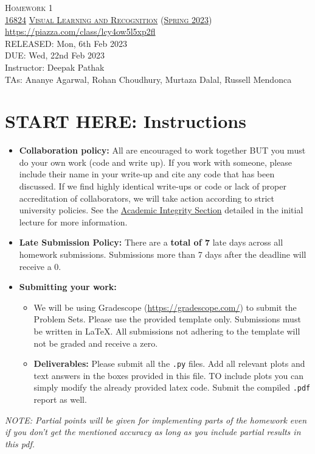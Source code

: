 \documentclass[11pt,addpoints,answers]{exam}
\title{\textsc{\hwName}} %
\author{}
\date{}
\date{}
\numberwithin{equation}{section} %
\numberwithin{figure}{section} %
\numberwithin{table}{section} %
\newcommand{\courseNum}{\href{https://visual-learning.cs.cmu.edu/}{16824}}
\newcommand{\courseName}{\href{https://visual-learning.cs.cmu.edu/}{Visual Learning and Recognition}}
\newcommand{\courseSem}{\href{https://visual-learning.cs.cmu.edu/}{Spring 2023}}
\newcommand{\courseUrl}{\url{https://piazza.com/class/lcy4ow5l5xp2fl}}
\newcommand{\hwNum}{Homework 1}
\newcommand{\hwTopic}{Image Classification and Object Detection}
\newcommand{\outDate}{Mon, 6th Feb 2023}
\newcommand{\dueDate}{Wed, 22nd Feb 2023}
\newcommand{\instructorName}{Deepak Pathak}
\newcommand{\taNames}{Ananye Agarwal, Rohan Choudhury, Murtaza Dalal, Russell Mendonca}
\begin{document}
\section*{}
\begin{center}
  \textsc{\LARGE \hwNum} \\
  \vspace{1em}
  \textsc{\large \courseNum{} \courseName{} (\courseSem)} \\
  \courseUrl\\
  \vspace{1em}
  RELEASED: \outDate \\
  DUE: \dueDate \\
  Instructor: \instructorName \\
  TAs: \taNames
\end{center}

\section*{START HERE: Instructions}
\begin{itemize}
\item \textbf{Collaboration policy:} All are encouraged to work together BUT you must do your own work (code and write up). If you work with someone, please include their name in your write-up and cite any code that has been discussed. If we find highly identical write-ups or code or lack of proper accreditation of collaborators, we will take action according to strict university policies. See the \href{hhttps://www.cmu.edu/policies/student-and-student-life/academic-integrity.html}{Academic Integrity Section} detailed in the initial lecture for more information.

\item\textbf{Late Submission Policy:} There are a \textbf{total of 7} late days across all homework submissions. Submissions more than 7 days after the deadline will receive a 0.

\item\textbf{Submitting your work:}

\begin{itemize}

\item We will be using Gradescope (\url{https://gradescope.com/}) to submit the Problem Sets. Please use the provided template only. Submissions must be written in LaTeX. All submissions not adhering to the template will not be graded and receive a zero. 
\item \textbf{Deliverables:} Please submit all the \texttt{.py} files. Add all relevant plots and text answers in the boxes provided in this file. TO include plots you can simply modify the already provided latex code. Submit the compiled \texttt{.pdf} report as well.
\end{itemize}
\end{itemize}
\emph{NOTE: Partial points will be given for implementing parts of the homework even if you don't get the mentioned accuracy as long as you include partial results in this pdf.}
\clearpage
\end{document}
